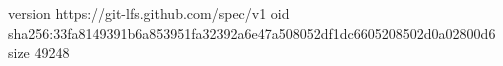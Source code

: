 version https://git-lfs.github.com/spec/v1
oid sha256:33fa8149391b6a853951fa32392a6e47a508052df1dc6605208502d0a02800d6
size 49248
